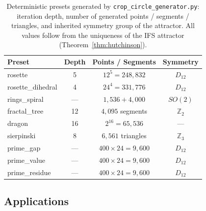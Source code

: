 \documentclass[10pt]{amsart}
\theoremstyle{break}
\begin{document}
\begin{table}[H]
	\centering
	{\fontsize{8}{10}\selectfont
		\begin{tabular}{|l|c|c|c|}
			\hline
			\textbf{Preset} & \textbf{Depth} & \textbf{Points / Segments} & \textbf{Symmetry} \\
			\hline
			rosette            & 5   & $12^{5} = 248{,}832$       & $D_{12}$ \\
			rosette\_dihedral  & 4   & $24^{4} = 331{,}776$       & $D_{12}$ \\
			rings\_spiral      & --- & $1{,}536 + 4{,}000$        & $SO(2)$ \\
			fractal\_tree      & 12  & $4{,}095$ segments         & $\mathbb{Z}_2$ \\
			dragon             & 16  & $2^{16} = 65{,}536$        & --- \\
			sierpinski         & 8   & $6{,}561$ triangles        & $\mathbb{Z}_3$ \\
			prime\_gap         & --- & $400 \times 24 = 9{,}600$  & $D_{12}$ \\
			prime\_value       & --- & $400 \times 24 = 9{,}600$  & $D_{12}$ \\
			prime\_residue     & --- & $400 \times 24 = 9{,}600$  & $D_{12}$ \\
			\hline
	\end{tabular}}
	\caption{%
		Deterministic presets generated by \texttt{crop\_circle\_generator.py}:
		iteration depth, number of generated points / segments / triangles,
		and inherited symmetry group of the attractor. All values follow
		from the uniqueness of the IFS attractor
		(Theorem~\ref{thm:hutchinson}).%
	}
	\label{tab:preset-summary}
\end{table}

\subsection{Applications}
\end{document}
